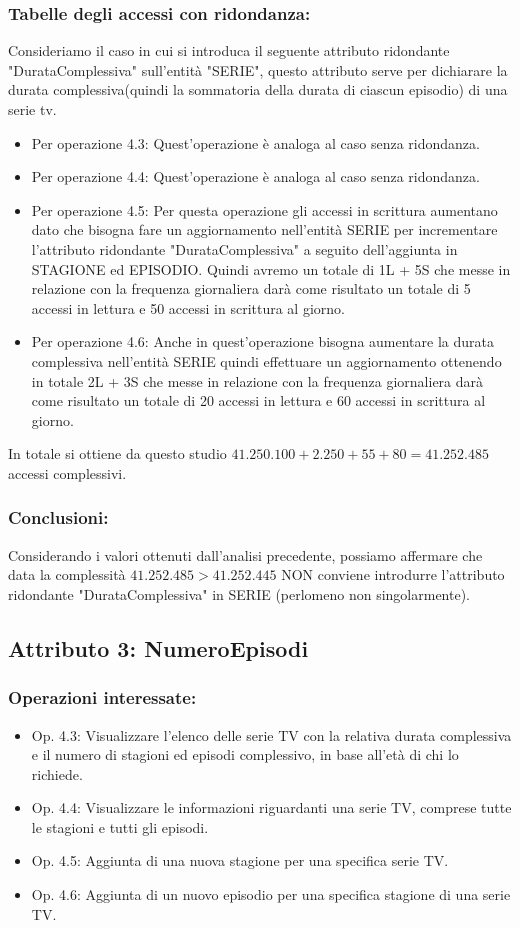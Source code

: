 \documentclass[a4paper,12pt]{report}
\begin{document}
\subsubsection{Tabelle degli accessi con ridondanza:}
Consideriamo il caso in cui si introduca il seguente attributo ridondante "DurataComplessiva" sull'entità "SERIE", questo attributo serve per dichiarare la durata complessiva(quindi la sommatoria della durata di ciascun episodio) di una serie tv.
\begin{itemize}
	\item Per operazione 4.3: Quest'operazione è analoga al caso senza ridondanza.
	\item Per operazione 4.4: Quest'operazione è analoga al caso senza ridondanza.
	\item Per operazione 4.5: Per questa operazione gli accessi in scrittura aumentano dato che bisogna fare un aggiornamento nell'entità SERIE per incrementare l'attributo ridondante "DurataComplessiva" a seguito dell'aggiunta in STAGIONE ed EPISODIO. Quindi avremo un totale di 1L + 5S che messe in relazione con la frequenza giornaliera darà come risultato un totale di 5 accessi in lettura e 50 accessi in scrittura al giorno.
	\item Per operazione 4.6: Anche in quest'operazione bisogna aumentare la durata complessiva nell'entità SERIE quindi effettuare un aggiornamento ottenendo in totale 2L + 3S che messe in relazione con la frequenza giornaliera darà come risultato un totale di 20 accessi in lettura e 60 accessi in scrittura al giorno.
\end{itemize}

In totale si ottiene da questo studio $41.250.100 + 2.250 + 55 + 80 = 41.252.485$ accessi complessivi.
\subsubsection{Conclusioni:}
Considerando i valori ottenuti dall'analisi precedente, possiamo affermare che data la complessità $41.252.485 > 41.252.445$ NON conviene introdurre l'attributo ridondante "DurataComplessiva" in SERIE (perlomeno non singolarmente).

\subsection{Attributo 3: NumeroEpisodi}
\subsubsection{Operazioni interessate:}
\begin{itemize}
	\item Op. 4.3: Visualizzare l’elenco delle serie TV con la relativa durata complessiva e il numero di stagioni ed episodi complessivo, in base all’età di chi lo richiede.
	\item Op. 4.4: Visualizzare le informazioni riguardanti una serie TV, comprese tutte le stagioni e tutti gli episodi.
	\item Op. 4.5: Aggiunta di una nuova stagione per una specifica serie TV.
	\item Op. 4.6: Aggiunta di un nuovo episodio per una specifica stagione di una serie TV.
\end{itemize}
\end{document}
